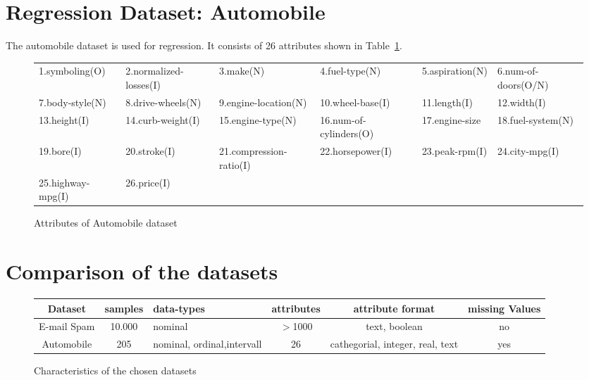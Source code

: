 \documentclass[11pt]{article}
\begin{document}
\section{Regression Dataset: Automobile}
The automobile dataset is used for regression. It consists of 26 attributes shown in Table~\ref{tab::2}.

\begin{figure}[h]
  \begin{tabular}{ l|l|l|l|l|l}
    \hline
    1.symboling(O) & 2.normalized-losses(I) & 3.make(N) &4.fuel-type(N) &5.aspiration(N) & 6.num-of-doors(O/N) \\ 
7.body-style(N)    &8.drive-wheels(N)     &9.engine-location(N)  &10.wheel-base(I) &11.length(I) &12.width(I)\\            
13.height(I) &14.curb-weight(I) &15.engine-type(N) &16.num-of-cylinders(O) &17.engine-size &18.fuel-system(N)\\      
    19.bore(I) &20.stroke(I) &21.compression-ratio(I) &22.horsepower(I) &23.peak-rpm(I)  &24.city-mpg(I)\\         
    25.highway-mpg(I) &26.price(I) & & & & \\ \hline
  \end{tabular}
    \caption{Attributes of Automobile dataset}
    \label{tab::2}
  \end{figure}



\section{Comparison of the datasets}


\begin{figure}[h]
  \begin{tabular}{ | c | c | p{2.5cm} | c | c | c |}
    \hline
    Dataset     & samples & data-types                & attributes  & attribute format                 & missing Values \\
    \hline
    E-mail Spam & 10.000  & nominal                   & $>$1000     & text, boolean                    & no \\
    \hline
    Automobile  & 205     & nominal, ordinal,intervall& 26          & cathegorial, integer, real, text & yes \\
    \hline
    
  \end{tabular}
    \caption{Characteristics of the chosen datasets}
    \label{tab::1}
  \end{figure}



\newpage


\end{document}
